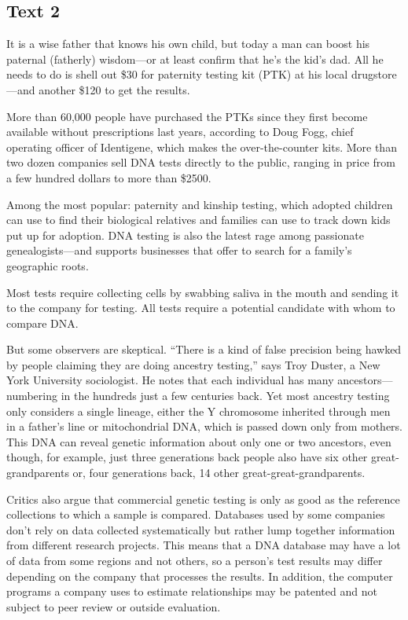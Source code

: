 \newpage
\subsection{Text 2}


It is a wise father that knows his own child, but today a man can boost
his paternal (fatherly) wisdom---or at least confirm that he's the
kid's dad. All he needs to do is shell out \$30 for paternity testing
kit (PTK) at his local drugstore---and another \$120 to get the
results.

More than 60,000 people have purchased the PTKs since they first become
available without prescriptions last years, according to Doug Fogg,
chief operating officer of Identigene, which makes the over-the-counter
kits. More than two dozen companies sell DNA tests directly to the
public, ranging in price from a few hundred dollars to more than \$2500.

Among the most popular: paternity and kinship testing, which adopted
children can use to find their biological relatives and families can use
to track down kids put up for adoption. DNA testing is also the latest
rage among passionate genealogists---and supports businesses that
offer to search for a family's geographic roots.

Most tests require collecting cells by swabbing saliva in the mouth and
sending it to the company for testing. All tests require a potential
candidate with whom to compare DNA.

But some observers are skeptical. ``There is a kind of false precision
being hawked by people claiming they are doing ancestry testing,'' says
Troy Duster, a New York University sociologist. He notes that each
individual has many ancestors---numbering in the hundreds just a few
centuries back. Yet most ancestry testing only considers a single
lineage, either the Y chromosome inherited through men in a father's
line or mitochondrial DNA, which is passed down only from mothers. This
DNA can reveal genetic information about only one or two ancestors, even
though, for example, just three generations back people also have six
other great-grandparents or, four generations back, 14 other
great-great-grandparents.

Critics also argue that commercial genetic testing is only as good as
the reference collections to which a sample is compared. Databases used
by some companies don't rely on data collected systematically but rather
lump together information from different research projects. This means
that a DNA database may have a lot of data from some regions and not
others, so a person's test results may differ depending on the company
that processes the results. In addition, the computer programs a company
uses to estimate relationships may be patented and not subject to peer
review or outside evaluation.


